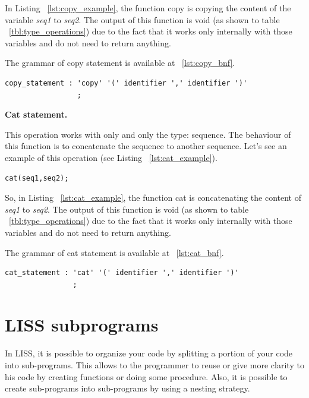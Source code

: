 \documentclass[
  oneside,
  11pt, a4paper,
  footinclude=true,
  headinclude=true,
  cleardoublepage=empty
]{scrbook}
\begin{document}
In Listing ~\ref{lst:copy_example}, the function copy is copying the content of the variable \textit{seq1} to \textit{seq2}.
The output of this function is void (as shown to table ~\ref{tbl:type_operations}) due to the fact that it works only internally with those variables and do not need to return anything.

The grammar of copy statement is available at ~\ref{lst:copy_bnf}.

\begin{lstlisting}[caption={BNF of copy statement in LISS},label={lst:copy_bnf}]
  copy_statement : 'copy' '(' identifier ',' identifier ')'
                 ;
\end{lstlisting}

\textbf{Cat statement.}

This operation works with only and only the type: sequence.
The behaviour of this function is to concatenate the sequence to another sequence.
Let's see an example of this operation (see Listing ~\ref{lst:cat_example}).

\begin{lstlisting}[caption={},label={}]
  cat(seq1,seq2);
\end{lstlisting}

So, in Listing ~\ref{lst:cat_example}, the function cat is concatenating the content of \textit{seq1} to \textit{seq2}.
The output of this function is void (as shown to table ~\ref{tbl:type_operations}) due to the fact that it works only internally with those variables and do not need to return anything.

The grammar of cat statement is available at ~\ref{lst:cat_bnf}.

\begin{lstlisting}[caption={BNF of cat statement in LISS},label={lst:cat_bnf}]
  cat_statement : 'cat' '(' identifier ',' identifier ')'
                ;
\end{lstlisting}

\section{LISS subprograms}
\label{sec:subprograms}

In LISS, it is possible to organize your code by splitting a portion of your code into sub-programs. This allows to the programmer to reuse or give more clarity to his code by creating functions or doing some procedure.
Also, it is possible to create sub-programs into sub-programs by using a nesting strategy.
\end{document}
